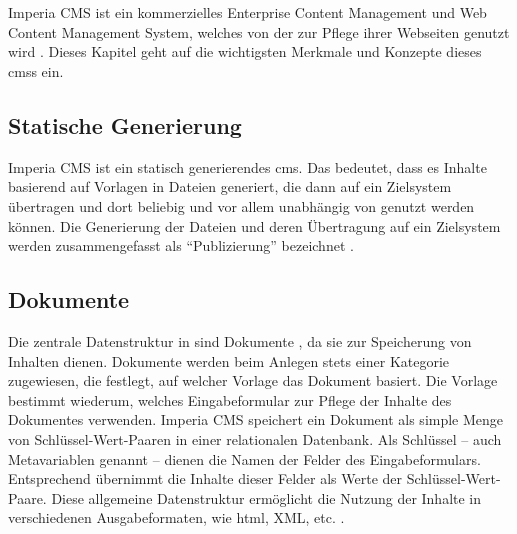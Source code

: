 \section{\imperia}
    \label{section:Imperia}
    Imperia CMS \cite{imperia:about} ist ein kommerzielles Enterprise Content Management und
    Web Content Management System, welches
    von der {\fernUni} zur Pflege ihrer Webseiten genutzt wird
    \cite{fernUni:imperia}.
    Dieses Kapitel geht auf die wichtigsten Merkmale und Konzepte
    dieses \glspl{cms} ein.

    \subsection{Statische Generierung}
        \label{section:imperiaStaticGeneration}
        Imperia CMS ist ein statisch generierendes \gls{cms}.
        Das bedeutet, dass es Inhalte basierend auf Vorlagen
        in Dateien generiert, die dann auf ein Zielsystem übertragen
        und dort beliebig und vor allem unabhängig von
        {\imperia} genutzt werden können.
        Die Generierung der Dateien und deren Übertragung auf ein Zielsystem
        werden zusammengefasst als "`Publizierung"' bezeichnet
        \cite[Kapitel 1.1]{imperia:ecmd}.


    \subsection{Dokumente}
        \label{section:imperiaDocuments}
        Die zentrale Datenstruktur in {\imperia} sind Dokumente \cite[Kapitel 1.1]{imperia:ecmd},
        da sie zur Speicherung von Inhalten dienen.
        Dokumente werden beim Anlegen stets einer Kategorie zugewiesen,
        die festlegt, auf welcher Vorlage
        das Dokument basiert.
        Die Vorlage \cite[Kapitel 1.1.4]{imperia:ecmd} bestimmt wiederum, welches Eingabeformular
        {\editors} zur Pflege der Inhalte des Dokumentes verwenden.
        Imperia CMS speichert ein Dokument als simple Menge von
        Schlüssel-Wert-Paaren in einer relationalen Datenbank.
        Als Schlüssel -- auch Metavariablen genannt -- dienen die Namen der Felder des Eingabeformulars.
        Entsprechend übernimmt {\imperia} die Inhalte dieser Felder
        als Werte der Schlüssel-Wert-Paare.
        Diese allgemeine Datenstruktur ermöglicht die Nutzung der Inhalte
        in verschiedenen Ausgabeformaten, wie \gls{html}, XML, etc.
        \cite[Kapitel 1.1.2]{imperia:ecmd}.

